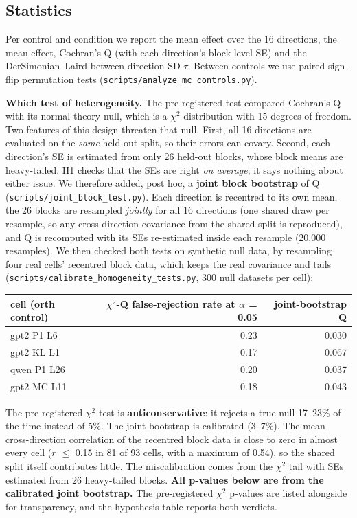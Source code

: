 \documentclass[
  10pt,
]{article}
\newcounter{none} %
\begin{document}
\subsection{Statistics}\label{statistics}

Per control and condition we report the mean effect over the 16
directions, the mean \textbar effect\textbar, Cochran's Q (with each
direction's block-level SE) and the DerSimonian--Laird between-direction
SD $\tau$. Between controls we use paired sign-flip permutation tests
(\texttt{scripts/analyze\_mc\_controls.py}).

\textbf{Which test of heterogeneity.} The pre-registered test compared
Cochran's Q with its normal-theory null, which is a $\chi^2$ distribution with
15 degrees of freedom. Two features of this design threaten that null.
First, all 16 directions are evaluated on the \emph{same} held-out
split, so their errors can covary. Second, each direction's SE is
estimated from only 26 held-out blocks, whose block means are
heavy-tailed. H1 checks that the SEs are right \emph{on average}; it
says nothing about either issue. We therefore added, post hoc, a
\textbf{joint block bootstrap} of Q
(\texttt{scripts/joint\_block\_test.py}). Each direction is recentred to
its own mean, the 26 blocks are resampled \emph{jointly} for all 16
directions (one shared draw per resample, so any cross-direction
covariance from the shared split is reproduced), and Q is recomputed
with its SEs re-estimated inside each resample (20,000 resamples). We
then checked both tests on synthetic null data, by resampling four real
cells' recentred block data, which keeps the real covariance and tails
(\texttt{scripts/calibrate\_homogeneity\_tests.py}, 300 null datasets
per cell):

{\def\LTcaptype{none} %
\begin{longtable}[]{@{}lrr@{}}
\toprule\noalign{}

cell (orth control) & $\chi^2$-Q false-rejection rate at $\alpha$ = 0.05 & joint-bootstrap Q \\

\midrule\noalign{}
\endhead
\bottomrule\noalign{}
\endlastfoot
gpt2 P1 L6 & 0.23 & 0.030 \\
gpt2 KL L1 & 0.17 & 0.067 \\
qwen P1 L26 & 0.20 & 0.037 \\
gpt2 MC L11 & 0.18 & 0.043 \\
\end{longtable}
}

The pre-registered $\chi^2$ test is \textbf{anticonservative}: it rejects a
true null 17--23\% of the time instead of 5\%. The joint bootstrap is
calibrated (3--7\%). The mean cross-direction correlation of the
recentred block data is close to zero in almost every cell
(\textbar $\bar{r}$\textbar{} $\le$ 0.15 in 81 of 93 cells, with a maximum of 0.54),
so the shared split itself contributes little. The miscalibration comes
from the $\chi^2$ tail with SEs estimated from 26 heavy-tailed blocks.
\textbf{All p-values below are from the calibrated joint bootstrap.} The
pre-registered $\chi^2$ p-values are listed alongside for transparency, and
the hypothesis table reports both verdicts.
\end{document}
